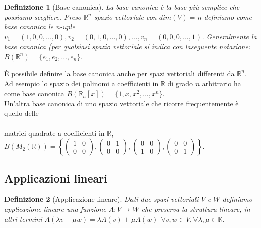 \documentclass[a4paper,12pt]{report}
\newtheorem{definizione}{Definizione}[chapter]
\begin{document}
\begin{definizione}[Base canonica]
    La base canonica è la base più semplice che possiamo scegliere. Preso $\mathbb{R}^n$ spazio vettoriale con $dim(V)=n$ definiamo come base canonica le n-uple $v_1=(1,0,0,...,0), v_2=(0,1,0,...,0),..., v_n=(0,0,0,...,1)$. Generalmente la base canonica (per qualsiasi spazio vettoriale si indica con laseguente notazione: 
    \\$B(\mathbb{R}^n)=\{e_1,e_2,...,e_n\}$. 

\end{definizione}
È possibile definire la base canonica anche per spazi vettoriali differenti da $\mathbb{R}^n$. Ad esempio lo spazio dei polinomi a coefficienti in $\mathbb{R}$ di grado $n$ arbitrario ha come base canonica $B(\mathbb{R}_n[x])=\{1, x,x^2,...,x^n\}$. 
\\Un'altra base canonica di uno spazio vettoriale che ricorre frequentemente è quello delle
\\
\\matrici quadrate a coefficienti in $\mathbb{R}$, $B(M_2(\mathbb{R}))=\left\{ \begin{pmatrix}
    1 & 0 \\0 & 0
\end{pmatrix},\begin{pmatrix}
    0 & 1 \\0 &0
\end{pmatrix},\begin{pmatrix}
    0 &0 \\ 1 &0
\end{pmatrix},\begin{pmatrix}
    0 & 0\\ 0 &1
\end{pmatrix}\right\}$.


\newpage


\subsection{Applicazioni lineari}

\begin{definizione}[Applicazione lineare]
    Dati due spazi vettoriali $V$ e $W$ definiamo applicazione lineare una funzione $A:V\to W$ che preserva la struttura lineare, in altri termini $A(\lambda v+\mu w)=\lambda A(v)+\mu A(w) \ \ \forall v,w \in V, \forall \lambda, \mu \in \mathbb{K}$.
\end{definizione}
\end{document}
